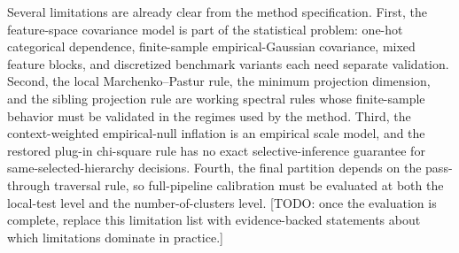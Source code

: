 Several limitations are already clear from the method specification. First, the
feature-space covariance model is part of the statistical problem: one-hot
categorical dependence, finite-sample empirical-Gaussian covariance, mixed
feature blocks, and discretized benchmark variants each need separate
validation. Second, the local Marchenko--Pastur rule, the minimum projection
dimension, and the sibling projection rule are working spectral rules whose
finite-sample behavior must be validated in the regimes used by the method.
Third, the context-weighted empirical-null inflation is an empirical scale
model, and the restored plug-in chi-square rule has no exact selective-inference
guarantee for same-selected-hierarchy decisions. Fourth, the final
partition depends on the pass-through traversal rule, so full-pipeline
calibration must be evaluated at both the local-test level and the
number-of-clusters level.
[TODO: once the evaluation is complete, replace this limitation list with
evidence-backed statements about which limitations dominate in practice.]

